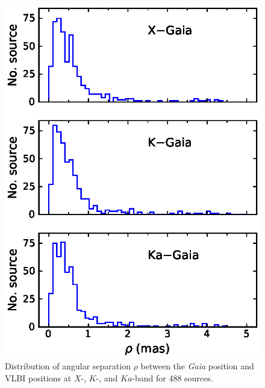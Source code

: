 \documentclass{aa-note}   %
\begin{document}
\begin{figure}[hbtp]
    \centering
    \includegraphics[width=\columnwidth]{figs/rho-hist}
    \caption[]{\label{fig:rho-hist}
        Distribution of angular separation $\rho$ between the {\it Gaia} position and VLBI positions at $X$-, $K$-, and $Ka$-band for 488 sources.
    }
\end{figure}
\end{document}
